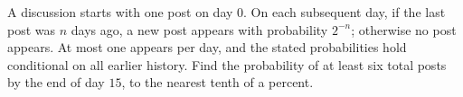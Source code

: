 A discussion starts with one post on day $0$. On each subsequent day, if the last post was $n$ days ago, a new post appears with probability $2^{-n}$; otherwise no post appears. At most one appears per day, and the stated probabilities hold conditional on all earlier history. Find the probability of at least six total posts by the end of day $15$, to the nearest tenth of a percent.
